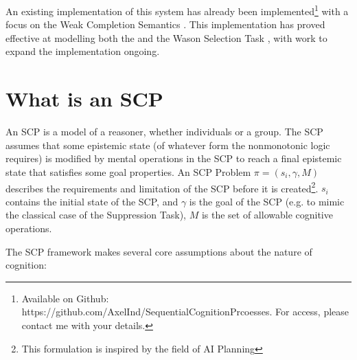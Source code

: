 \documentclass{article}
\begin{document}
An existing implementation of this system has already been implemented\footnote{Available on Github: https://github.com/AxelInd/SequentialCognitionPrcoesses. For access, please contact me with your details.} with a focus on the Weak Completion Semantics \citep{holldobler2015weak}. This implementation has proved effective at modelling both the \citep{byrne1989suppressing} and the Wason Selection Task \citep{wason1968reasoning}, with work to expand the implementation ongoing.

\section{What is an SCP}

An SCP is a model of a reasoner, whether individuals or a group. The SCP assumes that some epistemic state (of whatever form the nonmonotonic logic requires) is modified by mental operations in the SCP to reach a final epistemic state that satisfies some goal properties. An SCP Problem $\pi=(s_i,\gamma,M)$ describes the requirements and limitation of the SCP before it is created\footnote{This formulation is inspired by the field of AI Planning}. $s_i$ contains the initial state of the SCP, and $\gamma$ is the goal of the SCP (e.g. to mimic the classical case of the Suppression Task), $M$ is the set of allowable cognitive operations.

The SCP framework makes several core assumptions about the nature of cognition:
\end{document}
